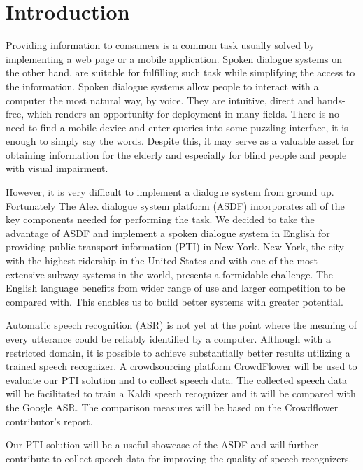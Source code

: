 \chapter*{Introduction}

Providing information to consumers is a common task usually solved by implementing a web page or a mobile application.
Spoken dialogue systems on the other hand, are suitable for fulfilling such task while simplifying the access to the information.
Spoken dialogue systems allow people to interact with a computer the most natural way, by voice.
They are intuitive, direct and hands-free, which renders an opportunity for deployment in many fields.
There is no need to find a mobile device and enter queries into some puzzling interface, it is enough to simply say the words.
Despite this, it may serve as a valuable asset for obtaining information for the elderly and especially for blind people and people with visual impairment.%

However, it is very difficult to implement a dialogue system from ground up.
Fortunately The Alex dialogue system platform\cite{asdf} (ASDF) incorporates all of the key components needed for performing the task.
We decided to take the advantage of ASDF and implement a spoken dialogue system in English for providing public transport information (PTI) in New York.
New York, the city with the highest ridership in the United States and with one of the most extensive subway systems in the world, presents a formidable challenge.
The English language benefits from wider range of use and larger competition to be compared with.
This enables us to build better systems with greater potential.

Automatic speech recognition (ASR) is not yet at the point where the meaning of every utterance could be reliably identified by a computer.\cite{asr}
Although with a restricted domain, it is possible to achieve substantially better results utilizing a trained speech recognizer.
A crowdsourcing platform CrowdFlower will be used to evaluate our PTI solution and to collect speech data.
The collected speech data will be facilitated to train a Kaldi speech recognizer and it will be compared with the Google ASR.
The comparison measures will be based on the Crowdflower contributor's report. %

Our PTI solution will be a useful showcase of the ASDF and will further contribute to collect speech data for improving the quality of speech recognizers.  %

